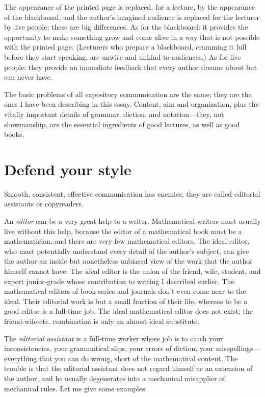\documentclass[12pt]{article}
\begin{document}
The appearance of the printed page is replaced, for a lecture, by the appearance of the blackboard, and the author's imagined audience is replaced for the lecturer by live people; these are big differences. As for the blackboard: it provides the opportunity to make something grow and come alive in a way that is not possible with the printed page. (Lecturers who prepare a blackboard, cramming it full before they start speaking, are unwise and unkind to audiences.) As for live people: they provide an immediate feedback that every author dreams about but can never have. 

The basic problems of all expository communication are the same; they are the ones I have been describing in this essay. Content, aim and organization, plus the vitally important details of grammar, diction, and notation---they, not showmanship, are the essential ingredients of good lectures, as well as good books. 

\section{Defend your style}

Smooth, consistent, effective communication has enemies; they are called editorial assistants or copyreaders. 

An \emph{editor} can be a very great help to a writer. Mathematical writers must usually live without this help, because the editor of a mathematical book must be a mathematician, and there are very few mathematical editors. The ideal editor, who must potentially understand every detail of the author's subject, can give the author an inside but nonetheless unbiased view of the work that the author himself cannot have. The ideal editor is the union of the friend, wife, student, and expert junior-grade whose contribution to writing I described earlier. The mathematical editors of book series and journals don't even come near to the ideal. Their editorial work is but a small fraction of their life, whereas to be a good editor is a full-time job. The ideal mathematical editor does not exist; the friend-wife-etc. combination is only an almost ideal substitute. 

The \emph{editorial assistant} is a full-time worker whose job is to catch your inconsistencies, your grammatical slips, your errors of diction, your misspellings---everything that you can do wrong, short of the mathematical content. The trouble is that the editorial assistant does not regard himself as an extension of the author, and he usually degenerates into a mechanical misapplier of mechanical rules. Let me give some examples.
\end{document}
